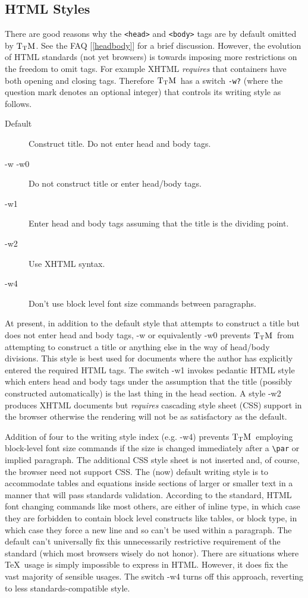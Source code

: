 \documentclass[12pt]{article}
\def\TtM{$\rm{}T_TH$}
\def\TtM{$\rm{}T_TM$}%
\begin{document}
\subsection{HTML Styles}
\label{htmlstyle}
There are good reasons why the \verb!<head>! and \verb!<body>! tags
are by default omitted by \TtM.  See the FAQ [\ref{headbody}] for a
brief discussion. However, the evolution of HTML standards (not yet
browsers) is towards imposing more restrictions on the freedom to omit
tags. For example XHTML \emph{requires} that containers have both
opening and closing tags. Therefore \TtM\ has a switch \verb|-w?|
(where the question mark denotes an optional integer) that controls
its writing style as follows.
\begin{description}
\item[Default] Construct title. Do not enter head and body tags.
\item[-w -w0] Do not construct title or enter head/body tags.
\item[-w1] Enter head and body tags assuming that the title is the
dividing point.
\item[-w2] Use XHTML syntax.
\item[-w4] Don't use block level font size commands between paragraphs.
\end{description}
At present, in addition to the default style that
attempts to construct a title but does not enter head and body tags,
-w or equivalently -w0 prevents \TtM\ from attempting to construct a
title or anything else in the way of head/body divisions. This style
is best used for documents where the author has explicitly entered the
required HTML tags. The switch -w1 invokes pedantic HTML style which
enters head and body tags under the assumption that the title
(possibly constructed automatically) is the last thing in the head
section. A style -w2 produces XHTML documents but \emph{requires}
cascading style sheet (CSS) support in the browser otherwise the
rendering will not be as satisfactory as the default. 

Addition of four to the writing style index (e.g. -w4) prevents
 \TtM\ employing block-level font size commands if the size is changed
 immediately after a \verb!\par! or implied paragraph. The additional
 CSS style sheet is not inserted and, of course, the browser need not
 support CSS. The (now) default writing style is to accommodate tables
 and equations inside sections of larger or smaller text in a manner
 that will pass standards validation. According to the standard, HTML
 font changing commands like most others, are either of
 inline type, in which case they are forbidden
 to contain block level constructs like
 tables, or block type, in which case they force a new line and so
 can't be used within a paragraph. The default can't universally fix
 this unnecessarily restrictive requirement of the standard (which
 most browsers wisely do not honor). There are situations where
 \TeX\ usage is simply impossible to express in HTML. However, it does
 fix the vast majority of sensible usages. The switch -w4 turns off
 this approach, reverting to less standards-compatible style.
\end{document}
